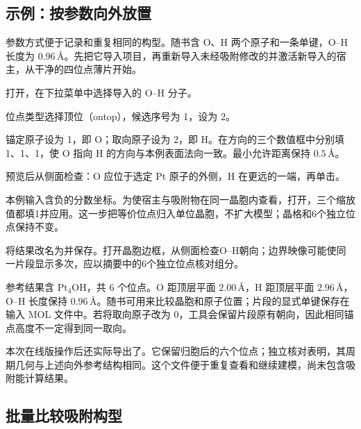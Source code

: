 
\subsection{示例：按参数向外放置 }

参数方式便于记录和重复相同的构型。随书含 O、H 两个原子和一条单键，O--H 长度为 $0.96\,\text{\AA}$。先把它导入项目，再重新导入未经吸附修改的并激活新导入的宿主，从干净的四位点薄片开始。

\begin{steps}
  \item 打开，在下拉菜单中选择导入的 O--H 分子。
  \item 位点类型选择顶位（ontop），候选序号为 1，设为 2。
  \item 锚定原子设为 1，即 O；取向原子设为 2，即 H。在方向的三个数值框中分别填 1、1、1，使 O 指向 H 的方向与本例表面法向一致。最小允许距离保持 $0.5\,\text{\AA}$。
  \item 预览后从侧面检查：O 应位于选定 Pt 原子的外侧，H 在更远的一端，再单击。
  \item 本例输入含负的分数坐标。为使宿主与吸附物在同一晶胞内查看，打开，三个缩放值都填1并应用。这一步把等价位点归入单位晶胞，不扩大模型；晶格和6个独立位点保持不变。
  \item 将结果改名为并保存。打开晶胞边框，从侧面检查O--H朝向；边界映像可能使同一片段显示多次，应以摘要中的6个独立位点核对组分。
\end{steps}



参考结果含 $\mathrm{Pt_4OH}$，共 6 个位点。O 距顶层平面 $2.00\,\text{\AA}$，H 距顶层平面 $2.96\,\text{\AA}$，O--H 长度保持 $0.96\,\text{\AA}$。随书可用来比较晶胞和原子位置；片段的显式单键保存在输入 MOL 文件中。若将取向原子改为 0，工具会保留片段原有朝向，因此相同锚点高度不一定得到同一取向。

本次在线版操作后还实际导出了。它保留归胞后的六个位点；独立核对表明，其周期几何与上述向外参考结构相同。这个文件便于重复查看和继续建模，尚未包含吸附能计算结果。

\subsection{批量比较吸附构型}

